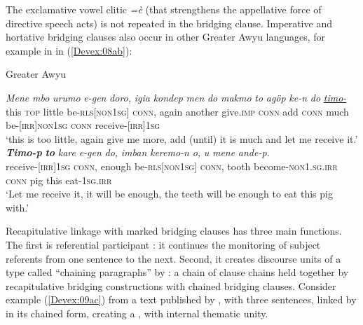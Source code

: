 \documentclass[output=paper]{LSP/langsci}
\begin{document}
The exclamative vowel clitic \textit{=è} (that strengthens the appellative force of directive speech acts) is not repeated in the bridging clause. Imperative and hortative bridging clauses also occur in other Greater Awyu languages, for example in  in (\ref{Devex:08ab}):



\begin{exe}
\ex \label{Devex:08ab}
 {} {Greater Awyu}
\begin{xlist}
\ex \label{Devex:08a}						
\gll \textit{Mene} \textit{mbo} \textit{urumo} \textit{e-gen} \textit{doro,} \textit{igia}	\textit{kondep}	\textit{men}	\textit{do} \textit{makmo} \textit{to}	\textit{agöp} \textit{ke-n} \textit{do} \underline{\textit{timo-}}\\
this \textsc{top} little be-\textsc{rls[non1sg]}	\textsc{conn}, again another give.\textsc{imp} \textsc{conn} add \textsc{conn} much be-\textsc{[irr]non1sg} \textsc{conn} receive-\textsc{[irr]1sg}\\
\glt `this is too little, again give me more, add (until) it is 
much and let me receive it.'\\

\ex \label{Devex:08b}						
\gll \textbf{\textit{Timo-p}} \textbf{\textit{to}} \textit{kare} \textit{e-gen} \textit{do,} \textit{imban}	\textit{keremo-n} \textit{o,}	\textit{u} \textit{mene} \textit{ande-p.}\\
receive-\textsc{[irr]1sg} \textsc{conn}, enough	be-\textsc{rls[non1sg]} \textsc{conn}, tooth become-\textsc{non1.sg.irr} \textsc{conn} pig this eat-\textsc{1sg.irr}\\
\glt `Let me receive it, it will be enough, the teeth will be enough to eat this pig with.'\\
\end{xlist}
\end{exe}

Recapitulative linkage with  marked bridging clauses has three main functions. The first is referential participant  : it continues the  monitoring of subject referents from one sentence to the next. Second,  it  creates discourse units of a type called ``chaining paragraphs''  by \citet[][337--341]{farr99}: a chain of clause chains held together by recapitulative bridging constructions with chained bridging clauses. Consider example (\ref{Devex:09ac}) from a text published by \citet[][159--162]{enk97}, with three sentences, linked by  in its chained form, creating a , with internal thematic unity.
\end{document}
